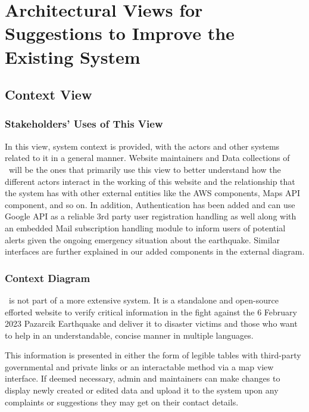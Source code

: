 \section{Architectural Views for Suggestions to Improve the Existing System}

\subsection{Context View}

\subsubsection{Stakeholders' Uses of This View}

In this view, system context is provided, with the actors and other systems related to it in a general manner. Website maintainers and Data collections of \afetbilgi\ will be the ones that primarily use this view to better understand how the different actors interact in the working of this website and the relationship that the system has with other external entities like the AWS components, Maps API component, and so on. In addition, Authentication has been added and can use Google API as a reliable 3rd party user registration handling as well along with an embedded Mail subscription handling module to inform users of potential alerts given the ongoing emergency situation about the earthquake.  Similar interfaces are further explained in our added components in the external diagram. 

\vspace*{\fill}
\newpage

\subsubsection{Context Diagram}

\afetbilgi\ is not part of a more extensive system. It is a standalone and open-source efforted website to verify critical information in the fight against the 6 February 2023 Pazarcik Earthquake and deliver it to disaster victims and those who want to help in an understandable, concise manner in multiple languages.

This information is presented in either the form of legible tables with third-party governmental and private links or an interactable method via a map view interface. If deemed necessary, admin and maintainers can make changes to display newly created or edited data and upload it to the system upon any complaints or suggestions they may get on their contact details.

